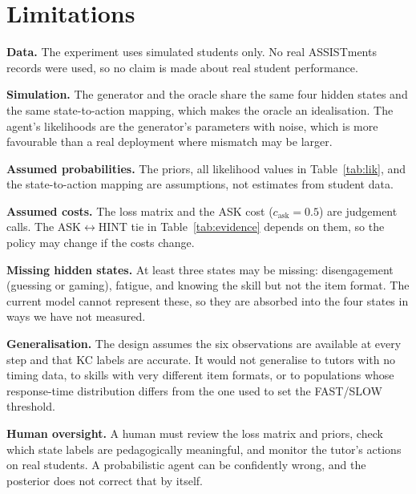 \documentclass[10pt,letterpaper,twocolumn]{article}
\begin{document}
\section{Limitations}
\textbf{Data.} The experiment uses simulated students only. No real ASSISTments records were used, so no claim is made about real student performance.

\textbf{Simulation.} The generator and the oracle share the same four hidden states and the same state-to-action mapping, which makes the oracle an idealisation. The agent's likelihoods are the generator's parameters with noise, which is more favourable than a real deployment where mismatch may be larger.

\textbf{Assumed probabilities.} The priors, all likelihood values in Table~\ref{tab:lik}, and the state-to-action mapping are assumptions, not estimates from student data.

\textbf{Assumed costs.} The loss matrix and the ASK cost ($c_{\text{ask}}=0.5$) are judgement calls. The ASK$\leftrightarrow$HINT tie in Table~\ref{tab:evidence} depends on them, so the policy may change if the costs change.

\textbf{Missing hidden states.} At least three states may be missing: disengagement (guessing or gaming), fatigue, and knowing the skill but not the item format. The current model cannot represent these, so they are absorbed into the four states in ways we have not measured.

\textbf{Generalisation.} The design assumes the six observations are available at every step and that KC labels are accurate. It would not generalise to tutors with no timing data, to skills with very different item formats, or to populations whose response-time distribution differs from the one used to set the FAST/SLOW threshold.

\textbf{Human oversight.} A human must review the loss matrix and priors, check which state labels are pedagogically meaningful, and monitor the tutor's actions on real students. A probabilistic agent can be confidently wrong, and the posterior does not correct that by itself.
\end{document}
